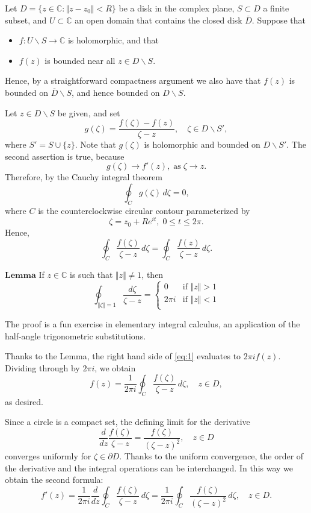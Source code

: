 \documentclass[12pt]{article}
\newcommand{\cnums}{\mathbb{C}}
\begin{document}
Let $D=\{z\in\cnums:\Vert z-z_0\Vert< R\}$
be a disk in the
complex plane, $S\subset D$ a finite subset, and $U\subset\cnums$ an
 open domain that contains the closed disk  $\overline{D}$. Suppose that
\begin{itemize}
\item $f:U\backslash S\rightarrow \cnums$ is holomorphic, and that
\item $f(z)$ is bounded near all $z\in D\backslash S$.  
\end{itemize}
Hence, by a straightforward compactness argument we also have that 
$f(z)$ is bounded on $\overline{D}\backslash S$, and hence bounded on
$D\backslash S$.  

Let $z\in D\backslash
S$ be given, and set
$$g(\zeta) = \frac{f(\zeta)-f(z)}{\zeta-z},\quad \zeta\in D\backslash
S',$$
where $S'=S\cup \{ z\}$.  Note that $g(\zeta)$ is holomorphic and
bounded on $ D\backslash S'$.
The second assertion is true, because
$$g(\zeta)\rightarrow f'(z),\;\mbox{as}\; \zeta\rightarrow z.$$
Therefore, by the Cauchy integral theorem
$$
\oint_C g(\zeta)\, d\zeta=0,
$$
where $C$ is the counterclockwise circular contour parameterized by
$$\zeta = z_0 + R e^{it},\; 0\leq t\leq 2\pi.$$
Hence,
\begin{equation}
  \label{eq:1}
\oint_C \frac{f(\zeta)}{\zeta-z}\, d\zeta = \oint_C
\frac{f(z)}{\zeta-z}\, d\zeta.
\end{equation}

\noindent
$\mathbf{Lemma}$
 If  $z\in\cnums$ is such that $\Vert z\Vert\neq 1$, then
$$
\oint_{\Vert\zeta\Vert=1} \frac{d\zeta}{\zeta-z} =
\begin{cases}
  0 &\text{if } \Vert z\Vert>1\\
  2\pi i &\text{if } \Vert z\Vert<1\\
\end{cases}
$$

The proof is a fun exercise in elementary integral calculus, an
application of the half-angle trigonometric substitutions.

Thanks to the Lemma, the  right hand side of \eqref{eq:1} evaluates to 
$2\pi i f(z).$
Dividing through by $2\pi i$, we obtain 
$$
f(z) = \frac{1}{2\pi i} \oint_C \frac{f(\zeta)}{\zeta-z}\, d\zeta,
\quad z\in D,
$$
as desired.

Since a circle is a compact set, the defining limit for the derivative
$$\frac{d}{dz} \frac{f(\zeta)}{\zeta-z}= 
\frac{f(\zeta)}{(\zeta-z)^2},\quad z\in D$$
converges uniformly for $\zeta\in \partial D$.  Thanks to the uniform
convergence, the order of the derivative and the integral operations 
can be interchanged.  In this way we obtain the second formula:
$$
f'(z) = \frac{1}{2\pi i} \frac{d}{dz} \oint_C
\frac{f(\zeta)}{\zeta-z}\, d\zeta  =  \frac{1}{2\pi i} \oint_C
\frac{f(\zeta)}{(\zeta-z)^2}\, d\zeta,\quad z\in D.$$
\end{document}
